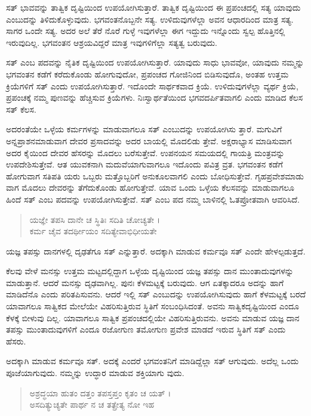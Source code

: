 ಸತ್ ಭಾವವನ್ನು ತಾತ್ವಿಕ ದೃಷ್ಟಿಯಿಂದ ಉಪಯೋಗಿಸುತ್ತಾರೆ. ತಾತ್ವಿಕ ದೃಷ್ಟಿಯಿಂದ ಈ ಪ್ರಪಂಚದಲ್ಲಿ ಸತ್ಯ ಯಾವುದು ಎಂಬುದನ್ನು ತಿಳಿದುಕೊಳ್ಳುವುದು. ಭಗವಂತನೊಬ್ಬನೇ ಸತ್ಯ. ಉಳಿದುವುಗಳೆಲ್ಲಾ ಅವನ ಆಧಾರದಿಂದ ಮಾತ್ರ ಸತ್ಯ. ಸಾಗರ ಒಂದೇ ಸತ್ಯ. ಅದರ ಅಲೆ ತೆರೆ ನೊರೆ ಗುಳ್ಳೆ ಇವುಗಳೆಲ್ಲಾ ಈಗ ಇದ್ದುದು ಇನ್ನೊಂದು ಸ್ವಲ್ಪ ಹೊತ್ತಿನಲ್ಲಿ ಇರುವುದಿಲ್ಲ. ಭಗವಂತನ ಆಶ್ರಯವಿದ್ದರೆ ಮಾತ್ರ ಇವುಗಳಿಗೆಲ್ಲಾ ಸತ್ಯತ್ವ ಬರುವುದು.

ಸತ್ ಎಂಬ ಪದವನ್ನು ನೈತಿಕ ದೃಷ್ಟಿಯಿಂದ ಉಪಯೋಗಿಸುತ್ತಾರೆ. ಯಾವುದು ಸಾಧು ಭಾವವೋ, ಯಾವುದು ನಮ್ಮನ್ನು ಭಗವಂತನ ಕಡೆಗೆ ಕರೆದುಕೊಂಡು ಹೋಗುವುದೋ, ಪ್ರಪಂಚದ ಗೋಜಿನಿಂದ ಬಿಡಿಸುವುದೊ, ಅಂತಹ ಉತ್ತಮ ಕ್ರಿಯೆಗಳಿಗೆ ಸತ್ ಎಂದು ಉಪಯೋಗಿಸುತ್ತಾರೆ. ಇದೊಂದೇ ಸಾರ್ಥಕವಾದ ಕ್ರಿಯೆ. ಉಳಿದುವುಗಳೆಲ್ಲಾ ವ್ಯರ್ಥ ಕ್ರಿಯೆ, ಪ್ರಪಂಚಕ್ಕೆ ನಮ್ಮ ಪುಣವನ್ನು ಹೆಚ್ಚಿಸುವ ಕ್ರಿಯೆಗಳು. ನಿಃಸ್ವಾರ್ಥತೆಯಿಂದ ಭಗವದರ್ಪಿತವಾಗಲಿ ಎಂದು ಮಾಡಿದ ಕೆಲಸ ಸತ್ ಕೆಲಸ.

ಅದರಂತೆಯೇ ಒಳ್ಳೆಯ ಕರ್ಮಗಳನ್ನು ಮಾಡುವಾಗಲೂ ಸತ್ ಎಂಬುದನ್ನು ಉಪಯೋಗಿಸು ತ್ತಾರೆ. ಮಗುವಿಗೆ ಅನ್ನಪ್ರಾಶನಮಾಡುವಾಗ ದೇವರ ಪ್ರಸಾದವನ್ನು ಅದರ ಬಾಯಲ್ಲಿ ಮೊದಲಿಡು ತ್ತೇವೆ. ಅಕ್ಷರಾಭ್ಯಾಸ ಮಾಡಿಸುವಾಗ ಅದರ ಕೈಯಿಂದ ದೇವರ ಹೆಸರನ್ನು ಮೊದಲು ಬರೆಸುತ್ತೇವೆ. ಉಪನಯನ ಸಮಯದಲ್ಲಿ ಗಾಯತ್ರಿ ಮಂತ್ರವನ್ನು ಉಪದೇಶಿಸುತ್ತೇವೆ. ಆತ ಯುವಕನಾಗಿ ಮದುವೆಯಾಗುವಾಗಲೂ ಇದೊಂದು ಪವಿತ್ರ ವ್ರತ. ಭಗವಂತನ ಕಡೆಗೆ ಹೋಗುವಾಗ ಸತಿಪತಿ ಯರು ಒಬ್ಬರು ಮತ್ತೊಬ್ಬರಿಗೆ ಅನುಕೂಲವಾಗಲಿ ಎಂದು ಬೋಧಿಸುತ್ತೇವೆ. ಗೃಹಪ್ರವೇಶಮಾಡು ವಾಗ ಮೊದಲು ದೇವರನ್ನು ತೆಗೆದುಕೊಂಡು ಹೋಗುತ್ತೇವೆ. ಯಾವ ಒಂದು ಒಳ್ಳೆಯ ಕೆಲಸವನ್ನು ಮಾಡುವಾಗಲೂ ಹಿಂದೆ ಸತ್ ಎಂಬ ಪದವನ್ನು ಉಪಯೋಗಿಸುತ್ತೇವೆ. ಸತ್ ಎಂಬ ಪದ ನಮ್ಮ ಬಾಳಿನಲ್ಲಿ ಓತಪ್ರೋತವಾಗಿ ಆವರಿಸಿದೆ.

\begin{verse}
ಯಜ್ಞೇ ತಪಸಿ ದಾನೇ ಚ ಸ್ಥಿತಿಃ ಸದಿತಿ ಚೋಚ್ಯತೇ ।\\ಕರ್ಮ ಚೈವ ತದರ್ಥೀಯಂ ಸದಿತ್ಯೇವಾಭಿಧೀಯತೇ 
\end{verse}

{\small ಯಜ್ಞ ತಪಸ್ಸು ದಾನಗಳಲ್ಲಿ ದೃಢತೆಗೂ ಸತ್ ಎನ್ನುತ್ತಾರೆ. ಅದಕ್ಕಾಗಿ ಮಾಡುವ ಕರ್ಮವೂ ಸತ್ ಎಂದೇ ಹೇಳಲ್ಪಡುತ್ತದೆ.}

ಕೆಲವು ವೇಳೆ ಮನಸ್ಸು ಉತ್ತಮ ಮಟ್ಟದಲ್ಲಿದ್ದಾಗ ಒಳ್ಳೆಯ ದೃಷ್ಟಿಯಿಂದ ಯಜ್ಞ ತಪಸ್ಸು ದಾನ ಮುಂತಾದುವುಗಳನ್ನು ಮಾಡುತ್ತಾನೆ. ಆದರೆ ಮನಸ್ಸು ದೃಢವಾಗಿಲ್ಲ. ಪುನಃ ಕೆಳಮಟ್ಟಕ್ಕೆ ಬರುವುದು. ಆಗ ಏತಕ್ಕಾದರೂ ಅದನ್ನು ಹಾಗೆ ಮಾಡಿದೆನೊ ಎಂದು ಪರಿತಪಿಸುವನು. ಆದರೆ ಇಲ್ಲಿ ಸತ್ ಎಂಬುದನ್ನು ಉಪಯೋಗಿಸುವುದು ಹಾಗೆ ಕೆಳಮಟ್ಟಕ್ಕೆ ಬರದೆ ಯಾವಾಗಲೂ ಸಾತ್ವಿಕದ ಮೇಲೆಯೇ ವಿಹರಿಸುತ್ತಿರುವ ಸ್ಥಿತಿಗೆ ಸಂಬಂಧಿಸಿದಂತೆ. ಅವನು ಸಾತ್ವಿಕದೃಷ್ಟಿಯಿಂದ ಎಂದೂ ಕೆಳಕ್ಕೆ ಬೀಳುವು ದಿಲ್ಲ. ಯಾವಾಗಲೂ ಸಾತ್ವಿಕ ಪ್ರಪಂಚದಲ್ಲಿಯೇ ವಿಹರಿಸುತ್ತಿರುವನು. ಅವನು ಮಾಡುವ ಯಜ್ಞ ದಾನ ತಪಸ್ಸು ಮುಂತಾದುವುಗಳಿಗೆ ಎಂದೂ ರಜೋಗುಣ ತಮೋಗುಣ ಪ್ರವೇಶ ಮಾಡದೆ ಇರುವ ಸ್ಥಿತಿಗೆ ಸತ್ ಎಂದು ಹೆಸರು.

ಅದಕ್ಕಾಗಿ ಮಾಡುವ ಕರ್ಮವೂ ಸತ್. ಅದಕ್ಕೆ ಎಂದರೆ ಭಗವಂತನಿಗೆ ಮಾಡಿದ್ದೆಲ್ಲಾ ಸತ್ ಆಗುವುದು. ಅದೆಲ್ಲ ಒಂದು ಪೂಜೆಯಾಗುವುದು. ನಮ್ಮನ್ನು ಉದ್ಧಾರ ಮಾಡುವ ಶಕ್ತಿಯಾಗು ವುದು.

\begin{verse}
ಅಶ್ರದ್ಧಯಾ ಹುತಂ ದತ್ತಂ ತಪಸ್ತಪ್ತಂ ಕೃತಂ ಚ ಯತ್ ।\\ಅಸದಿತ್ಯುಚ್ಯತೇ ಪಾರ್ಥ ನ ಚ ತತ್ಪ್ರೇತ್ಯ ನೋ ಇಹ 
\end{verse}

